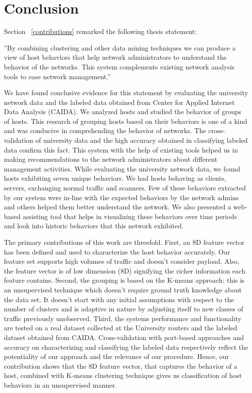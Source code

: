 
\chapter{Conclusion} \label{chap:conclusion}

Section ~\ref{contributions} remarked the following thesis statement:

''By combining clustering and other data mining techniques we can produce a view of host behaviors that help network administrators to understand the behavior of the networks. This system complements existing network analysis tools to ease network management.''

We have found conclusive evidence for this statement by evaluating the university network data and the labeled data obtained from Center for Applied Internet Data Analysis (CAIDA). We analyzed hosts and studied the behavior of groups of hosts. This research of grouping hosts based on their behaviors is one of a kind and was conducive in comprehending the behavior of networks. The cross-validation of university data and the high accuracy obtained in classifying labeled data confirm this fact. This system with the help of existing tools helped us in making recommendations to the network administrators about different management activities. While evaluating the university network data, we found hosts exhibiting seven unique behaviors. We had hosts behaving as clients, servers, exchanging normal traffic and scanners. Few of these behaviors extracted by our system were in-line with the expected behaviors by the network admins and others helped them better understand the network. We also presented a web-based assisting tool that helps in visualizing these behaviors over time periods and look into historic behaviors that this network exhibited.

The primary contributions of this work are threefold. First, an 8D feature vector has been defined and used to characterize the host behavior accurately. Our feature set supports high volumes of traffic and doesn't consider payload. Also, the feature vector is of low dimension (8D) signifying the richer information each feature contains.
Second, the grouping is based on the K-means approach: this is an unsupervised technique which doesn't require ground truth knowledge about the data set. It doesn't start with any initial assumptions with respect to the number of clusters and is adaptive in nature by adjusting itself to new classes of traffic previously unobserved. Third, the systems performance and functionality are tested on a real dataset collected at the University routers and the labeled dataset obtained from CAIDA. Cross-validation with port-based approaches and accuracy on characterizing and classifying the labeled data respectively reflect the potentiality of our approach and the relevance of our procedure.
Hence, our contribution shows that the 8D feature vector, that captures the behavior of a host, combined with K-means clustering technique gives us classification of host behaviors in an unsupervised manner.


